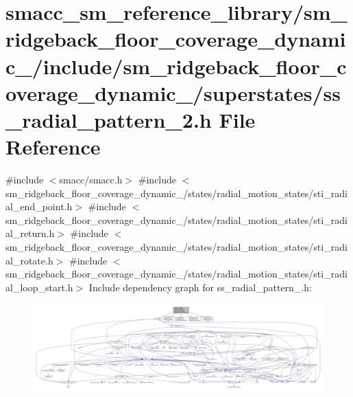 \hypertarget{sm__ridgeback__floor__coverage__dynamic__1_2include_2sm__ridgeback__floor__coverage__dynamic__1_2cbf1c2c6738782db8694400663dab62}{}\section{smacc\+\_\+sm\+\_\+reference\+\_\+library/sm\+\_\+ridgeback\+\_\+floor\+\_\+coverage\+\_\+dynamic\+\_/include/sm\+\_\+ridgeback\+\_\+floor\+\_\+coverage\+\_\+dynamic\+\_/superstates/ss\+\_\+radial\+\_\+pattern\+\_\+2.h File Reference}
\label{sm__ridgeback__floor__coverage__dynamic__1_2include_2sm__ridgeback__floor__coverage__dynamic__1_2cbf1c2c6738782db8694400663dab62}
{\ttfamily \#include $<$smacc/smacc.\+h$>$}\newline
{\ttfamily \#include $<$sm\+\_\+ridgeback\+\_\+floor\+\_\+coverage\+\_\+dynamic\+\_/states/radial\+\_\+motion\+\_\+states/sti\+\_\+radial\+\_\+end\+\_\+point.\+h$>$}\newline
{\ttfamily \#include $<$sm\+\_\+ridgeback\+\_\+floor\+\_\+coverage\+\_\+dynamic\+\_/states/radial\+\_\+motion\+\_\+states/sti\+\_\+radial\+\_\+return.\+h$>$}\newline
{\ttfamily \#include $<$sm\+\_\+ridgeback\+\_\+floor\+\_\+coverage\+\_\+dynamic\+\_/states/radial\+\_\+motion\+\_\+states/sti\+\_\+radial\+\_\+rotate.\+h$>$}\newline
{\ttfamily \#include $<$sm\+\_\+ridgeback\+\_\+floor\+\_\+coverage\+\_\+dynamic\+\_/states/radial\+\_\+motion\+\_\+states/sti\+\_\+radial\+\_\+loop\+\_\+start.\+h$>$}\newline
Include dependency graph for ss\+\_\+radial\+\_\+pattern\+\_.\+h\+:
\nopagebreak
\begin{figure}[H]
\begin{center}
\leavevmode
\includegraphics[width=350pt]{sm__ridgeback__floor__coverage__dynamic__1_2include_2sm__ridgeback__floor__coverage__dynamic__1_fb8b2e7632dccfa720deffef5be8b111}
\end{center}
\end{figure}
